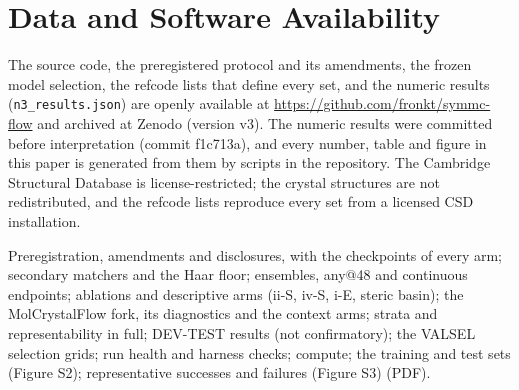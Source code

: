 \documentclass[journal=acsodf,manuscript=article]{achemso}
\begin{document}
\section*{Data and Software Availability}
The source code, the preregistered protocol and its amendments, the frozen model selection,
the refcode lists that define every set, and the numeric results (\texttt{n3\_results.json})
are openly available at \url{https://github.com/fronkt/symmc-flow} and archived at
Zenodo (version v3)\cite{cai2026symmcflow}. The numeric results were committed before
interpretation (commit f1c713a), and every number, table and figure in this paper is
generated from them by scripts in the repository. The Cambridge Structural Database is
license-restricted; the crystal structures are not redistributed, and the refcode lists
reproduce every set from a licensed CSD installation.

\begin{suppinfo}
Preregistration, amendments and disclosures, with the checkpoints of every arm; secondary
matchers and the Haar floor; ensembles, any@48 and continuous endpoints; ablations and
descriptive arms (ii-S, iv-S, i-E, steric basin); the MolCrystalFlow fork, its diagnostics and
the context arms; strata and representability in full; DEV-TEST results (not confirmatory);
the VALSEL selection grids; run health and harness checks; compute; the training and test sets
(Figure S2); representative successes and failures (Figure S3) (PDF).
\end{suppinfo}


\end{document}
